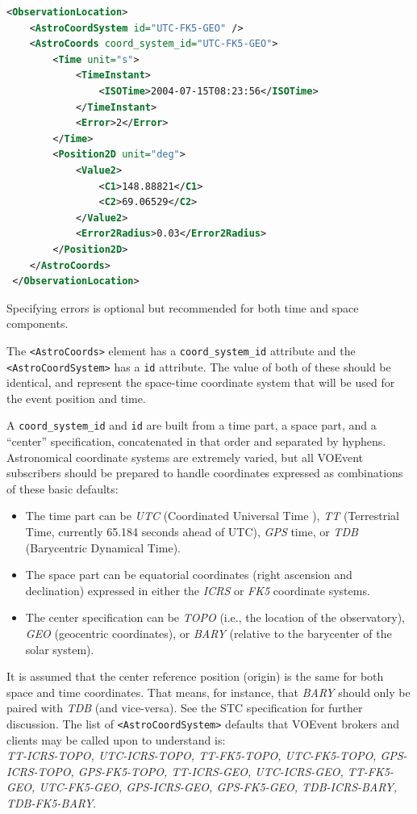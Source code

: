 \documentclass[11pt,a4paper]{ivoa}
\begin{document}
\begin{lstlisting}[language=XML]
<ObservationLocation>
    <AstroCoordSystem id="UTC-FK5-GEO" />
    <AstroCoords coord_system_id="UTC-FK5-GEO">
        <Time unit="s">
            <TimeInstant>
                <ISOTime>2004-07-15T08:23:56</ISOTime>
            </TimeInstant>
            <Error>2</Error>
        </Time>
        <Position2D unit="deg">
            <Value2>
                <C1>148.88821</C1>
                <C2>69.06529</C2>
            </Value2>
            <Error2Radius>0.03</Error2Radius>
        </Position2D>
    </AstroCoords>
 </ObservationLocation> 
\end{lstlisting}

Specifying errors is optional but recommended for both time and space 
components. 

The {\tt <AstroCoords>} element has a {\tt coord\_system\_id} attribute and the 
{\tt <AstroCoordSystem>} has a {\tt id} attribute. The value of both of these should be identical, and represent the space-time coordinate system that will be used for the event position and time. 

A {\tt coord\_system\_id} and {\tt id} are built from a time part, a space part, 
and a ``center'' specification, concatenated in that order and separated by 
hyphens. Astronomical coordinate systems are extremely varied, but all VOEvent 
subscribers should be prepared to handle coordinates expressed as combinations 
of these basic defaults: 
\begin{itemize}
\item The time part can be \emph{UTC} (Coordinated Universal Time 
\citep{bib26}), \emph{TT} (Terrestrial Time, currently 65.184 seconds ahead of 
UTC), \emph{GPS} time, or \emph{TDB} (Barycentric Dynamical Time). 
\item The space part can be equatorial coordinates (right ascension and 
declination) expressed in either the \emph{ICRS} or \emph{FK5} coordinate 
systems. 
\item The center specification can be \emph{TOPO} (i.e., the location of the 
observatory), \emph{GEO} (geocentric coordinates), or \emph{BARY} (relative to 
the barycenter of the solar system). 
\end{itemize}


It is assumed that the center reference position (origin) is the same for both 
space and time coordinates. That means, for instance, that \emph{BARY} should 
only be paired with \emph{TDB} (and vice-versa). See the STC specification 
\citep{2007ivoa.spec.1030R} %
for further discussion. The list of {\tt <AstroCoordSystem>} defaults that 
VOEvent brokers and clients may be called upon to understand is: \\
\emph{TT-ICRS-TOPO, UTC-ICRS-TOPO, TT-FK5-TOPO, UTC-FK5-TOPO, GPS-ICRS-TOPO, 
GPS-FK5-TOPO, TT-ICRS-GEO, UTC-ICRS-GEO, TT-FK5-GEO, UTC-FK5-GEO, GPS-ICRS-GEO, 
GPS-FK5-GEO, TDB-ICRS-BARY, TDB-FK5-BARY}. 
\end{document}
